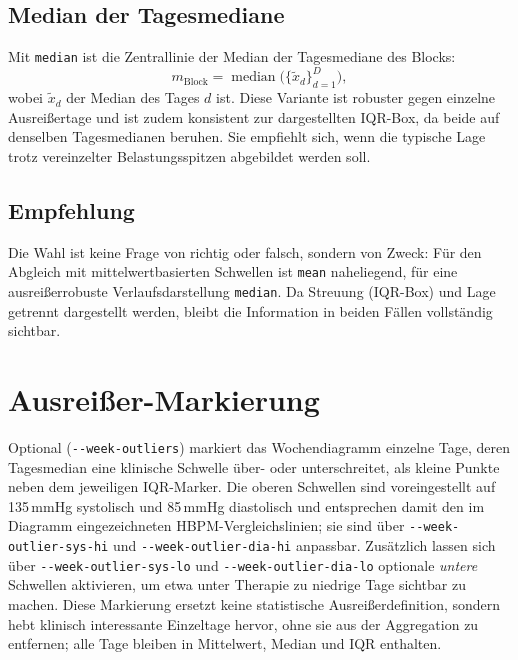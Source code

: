 \documentclass[conference]{IEEEtran}
\newcommand{\param}[1]{\texttt{#1}}
\begin{document}
\subsection{Median der Tagesmediane}
Mit \texttt{median} ist die Zentrallinie der Median der Tagesmediane des Blocks:
\begin{equation}
m_{\mathrm{Block}} = \operatorname{median}\bigl(\{\tilde{x}_d\}_{d=1}^{D}\bigr),
\end{equation}
wobei $\tilde{x}_d$ der Median des Tages $d$ ist. Diese Variante ist robuster
gegen einzelne Ausreißertage und ist zudem konsistent zur dargestellten
IQR-Box, da beide auf denselben Tagesmedianen beruhen. Sie empfiehlt sich,
wenn die typische Lage trotz vereinzelter Belastungsspitzen abgebildet werden
soll.

\subsection{Empfehlung}
Die Wahl ist keine Frage von richtig oder falsch, sondern von Zweck: Für den
Abgleich mit mittelwertbasierten Schwellen ist \texttt{mean} naheliegend, für
eine ausreißerrobuste Verlaufsdarstellung \texttt{median}. Da Streuung
(IQR-Box) und Lage getrennt dargestellt werden, bleibt die Information in
beiden Fällen vollständig sichtbar.

\section{Ausreißer-Markierung}
Optional (\param{-{}-week-outliers}) markiert das Wochendiagramm einzelne Tage,
deren Tagesmedian eine klinische Schwelle über- oder unterschreitet, als kleine
Punkte neben dem jeweiligen IQR-Marker. Die oberen Schwellen sind
voreingestellt auf 135\,mmHg systolisch und 85\,mmHg diastolisch und
entsprechen damit den im Diagramm eingezeichneten HBPM-Vergleichslinien;
sie sind über \param{-{}-week-outlier-sys-hi} und
\param{-{}-week-outlier-dia-hi} anpassbar. Zusätzlich lassen sich über
\param{-{}-week-outlier-sys-lo} und \param{-{}-week-outlier-dia-lo} optionale
\emph{untere} Schwellen aktivieren, um etwa unter Therapie zu niedrige Tage
sichtbar zu machen. Diese Markierung ersetzt keine statistische
Ausreißerdefinition, sondern hebt klinisch interessante Einzeltage hervor,
ohne sie aus der Aggregation zu entfernen; alle Tage bleiben in Mittelwert,
Median und IQR enthalten.
\end{document}
